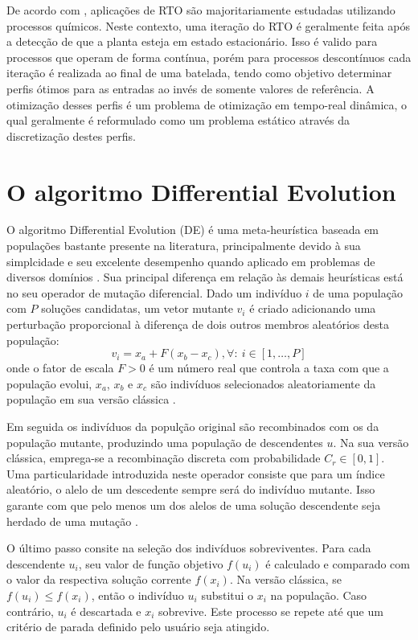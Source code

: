 \documentclass[conference]{IEEEtran}
\begin{document}
De acordo com \cite{marchetti2020modifier}, aplicações de RTO são majoritariamente estudadas utilizando processos químicos. Neste contexto, uma iteração do RTO é geralmente feita após a detecção de que a planta esteja em estado estacionário. Isso é valido para processos que operam de forma contínua, porém para processos descontínuos cada iteração é realizada ao final de uma batelada, tendo como objetivo determinar perfis ótimos para as entradas ao invés de somente valores de referência. A otimização desses perfis é um problema de otimização em tempo-real dinâmica, o qual geralmente é reformulado como um problema estático \cite{costello2011modifier} através da discretização destes perfis.

\section{O algoritmo Differential Evolution}
O algoritmo Differential Evolution (DE) é uma meta-heurística baseada em populações bastante presente na literatura, principalmente devido à sua simplcidade e seu excelente desempenho quando aplicado em problemas de diversos domínios \cite{pant2020differential}. Sua principal diferença em relação às demais heurísticas está no seu operador de mutação diferencial. Dado um indivíduo $i$ de uma população com $P$ soluções candidatas, um vetor mutante $v_i$ é criado adicionando uma perturbação proporcional à diferença de dois outros membros aleatórios desta população:
\begin{equation}
 v_i = x_a + F\left( x_b - x_c \right), \forall :\ i \in [1,\dots,P]
\end{equation}
onde o fator de escala $F > 0$ é um número real que controla a taxa com que a população evolui, $x_a$, $x_b$ e $x_c$ são indivíduos selecionados aleatoriamente da população em sua versão clássica \cite{eiben2007introduction}. 

Em seguida os indivíduos da populção original são recombinados com os da população mutante, produzindo uma população de descendentes $u$. Na sua versão clássica, emprega-se a recombinação discreta com probabilidade $C_r \in [0,1]$. Uma particularidade introduzida neste operador consiste que para um índice aleatório, o alelo de um descedente sempre será do indivíduo mutante. Isso garante com que pelo menos um dos alelos de uma solução descendente seja herdado de uma mutação \cite{eiben2007introduction}.

O último passo consite na seleção dos indivíduos sobreviventes. Para cada descendente $u_i$, seu valor de função objetivo $f(u_i)$ é calculado e comparado com o valor da respectiva solução corrente $f(x_i)$. Na versão clássica, se $f(u_i) \leq f(x_i)$, então o indivíduo $u_i$ substitui o $x_i$ na população. Caso contrário, $u_i$ é descartada e $x_i$ sobrevive. Este processo se repete até que um critério de parada definido pelo usuário seja atingido.
\end{document}
